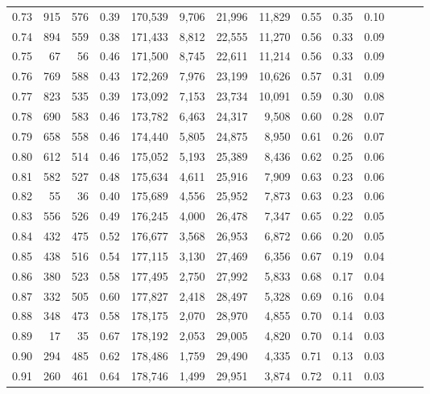 \begin{tabular}{rrrrrrrrrrrrrr}
0.73 &    915 &    576 &  0.39 &  170,539 &    9,706 &  21,996 &  11,829 &  0.55 &  0.35 &      0.10 \\
0.74 &    894 &    559 &  0.38 &  171,433 &    8,812 &  22,555 &  11,270 &  0.56 &  0.33 &      0.09 \\
0.75 &     67 &     56 &  0.46 &  171,500 &    8,745 &  22,611 &  11,214 &  0.56 &  0.33 &      0.09 \\
0.76 &    769 &    588 &  0.43 &  172,269 &    7,976 &  23,199 &  10,626 &  0.57 &  0.31 &      0.09 \\
0.77 &    823 &    535 &  0.39 &  173,092 &    7,153 &  23,734 &  10,091 &  0.59 &  0.30 &      0.08 \\
0.78 &    690 &    583 &  0.46 &  173,782 &    6,463 &  24,317 &   9,508 &  0.60 &  0.28 &      0.07 \\
0.79 &    658 &    558 &  0.46 &  174,440 &    5,805 &  24,875 &   8,950 &  0.61 &  0.26 &      0.07 \\
0.80 &    612 &    514 &  0.46 &  175,052 &    5,193 &  25,389 &   8,436 &  0.62 &  0.25 &      0.06 \\
0.81 &    582 &    527 &  0.48 &  175,634 &    4,611 &  25,916 &   7,909 &  0.63 &  0.23 &      0.06 \\
0.82 &     55 &     36 &  0.40 &  175,689 &    4,556 &  25,952 &   7,873 &  0.63 &  0.23 &      0.06 \\
0.83 &    556 &    526 &  0.49 &  176,245 &    4,000 &  26,478 &   7,347 &  0.65 &  0.22 &      0.05 \\
0.84 &    432 &    475 &  0.52 &  176,677 &    3,568 &  26,953 &   6,872 &  0.66 &  0.20 &      0.05 \\
0.85 &    438 &    516 &  0.54 &  177,115 &    3,130 &  27,469 &   6,356 &  0.67 &  0.19 &      0.04 \\
0.86 &    380 &    523 &  0.58 &  177,495 &    2,750 &  27,992 &   5,833 &  0.68 &  0.17 &      0.04 \\
0.87 &    332 &    505 &  0.60 &  177,827 &    2,418 &  28,497 &   5,328 &  0.69 &  0.16 &      0.04 \\
0.88 &    348 &    473 &  0.58 &  178,175 &    2,070 &  28,970 &   4,855 &  0.70 &  0.14 &      0.03 \\
0.89 &     17 &     35 &  0.67 &  178,192 &    2,053 &  29,005 &   4,820 &  0.70 &  0.14 &      0.03 \\
0.90 &    294 &    485 &  0.62 &  178,486 &    1,759 &  29,490 &   4,335 &  0.71 &  0.13 &      0.03 \\
0.91 &    260 &    461 &  0.64 &  178,746 &    1,499 &  29,951 &   3,874 &  0.72 &  0.11 &      0.03 \\

\end{tabular}
